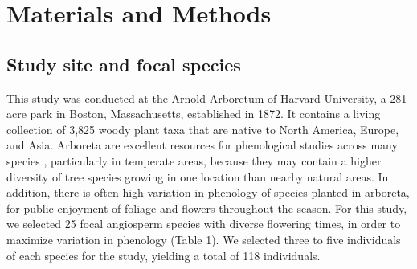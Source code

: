 \documentclass{article}
\begin{document}
\section* {Materials and Methods}
\subsection*{Study site and focal species}
This study was conducted at the Arnold Arboretum of Harvard University, a 281-acre park in Boston, Massachusetts, established in 1872. It contains a living collection of 3,825 woody plant taxa that are native to North America, Europe, and Asia. Arboreta are excellent resources for phenological studies across many species \citep [e.g., ][]{primack2009a}, particularly in temperate areas, because they may contain a higher diversity of tree species growing in one location than nearby natural areas. In addition, there is often high variation in phenology of species planted in arboreta, for public enjoyment of foliage and flowers throughout the season. For this study, we selected 25 focal angiosperm species with diverse flowering times, in order to maximize variation in phenology (Table 1). We selected three to five individuals of each species for the study, yielding a total of 118 individuals.
\end{document}
